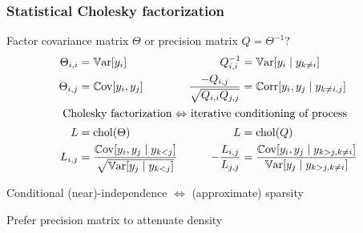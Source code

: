 \documentclass{beamer}                             %
\newcommand*{\N}{\mathcal{N}}
\renewcommand*{\vec}[1]{\bm{#1}}
\newcommand*{\CM}{\Theta}
\newcommand*{\PM}{Q}
\DeclareMathOperator{\chol}{chol}
\DeclareMathOperator{\Var}{\mathbb{V}ar}
\DeclareMathOperator{\Cov}{\mathbb{C}ov}
\DeclareMathOperator{\Corr}{\mathbb{C}orr}
\newenvironment{wideitemize}
  {\itemize\setlength{\itemsep}{0.5cm}}
  {\enditemize}
\begin{document}
\begin{frame}
\frametitle{Statistical Cholesky factorization}

\begin{wideitemize}
  \item<+-> Factor covariance matrix \( \CM
    \) or precision matrix \( \PM = \CM^{-1} \)?
    \begin{align*}
      \CM_{i, i}      &= \Var[y_i] &
      \PM_{i, i}^{-1} &= \Var[y_i \mid y_{k \neq i}] \\
      \CM_{i, j} &= \Cov[y_i, y_j] &
      \frac{-\PM_{i, j}}{\sqrt{\PM_{i, i} \PM_{j, j}}} &=
        \Corr[y_i, y_j \mid y_{k \neq i, j}] \\
      \intertext{
        Cholesky factorization \( \Leftrightarrow \)
        iterative conditioning of process
      }
      L &= \chol(\CM) &
      L &= \chol(\PM) \\
      L_{i, j} &=
        \frac{\Cov[y_i, y_j \mid y_{k < j}]}
       {\sqrt{\Var[y_j      \mid y_{k < j}]}} &
      -\frac{L_{i, j}}{L_{j, j}} &=
        \frac{\Cov[y_i, y_j \mid y_{k > j, k \neq i}]}
             {\Var[y_j      \mid y_{k > j, k \neq i}]}
    \end{align*}
  \item<+-> Conditional (near)-independence \(
    \Leftrightarrow \) (approximate) sparsity
  \item<+-> Prefer precision matrix to attenuate density
\end{wideitemize}
\end{frame}
\end{document}
